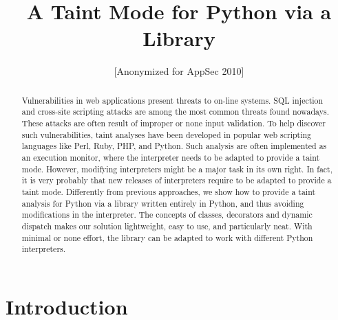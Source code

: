 \documentclass[oribibl]{llncs}
\title{A Taint Mode for Python via a Library}
\author{[Anonymized for AppSec 2010]}
\institute{\vspace{-5ex}}
\begin{document}
\lstset{
        stringstyle=\ttfamily, 
        showstringspaces=false,
        extendedchars=true,  
}



\maketitle
\thispagestyle{plain}




\begin{abstract}
Vulnerabilities in web applications present threats to on-line systems.
SQL injection and cross-site scripting attacks are among the
most common threats found nowadays. These attacks are
often result of improper or none input validation. 
To help discover such vulnerabilities, 
taint analyses have been developed in popular web scripting 
languages like Perl, Ruby, PHP, 
and Python. Such analysis are often 
implemented as an execution monitor, where the interpreter
needs to be adapted to provide a taint mode. 
However, modifying interpreters might be a major task in its own
right. In fact, it is very probably that  
new releases of interpreters require to 
be adapted to provide a taint mode.
Differently from previous approaches, 
we show how to provide a taint analysis for Python via a library
 written entirely in Python, and thus avoiding modifications in the interpreter.
The concepts of classes, decorators and dynamic dispatch
makes our solution lightweight, easy to use, and particularly neat.
With minimal or none effort, the library can be adapted
to work with different Python interpreters.
\end{abstract}
 
\section{Introduction}
\label{sec:intro}
\end{document}
